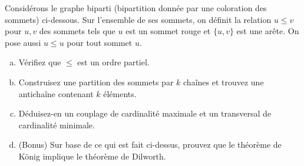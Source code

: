 \newpage


\begin{exo}
Consid\'erons le graphe biparti (bipartition donn\'ee par une coloration des sommets) ci-dessous. Sur l'ensemble de ses sommets, on d\'efinit la relation $u\leq v$ pour $u,v$ des sommets tels que $u$ est un sommet rouge et $\{u,v\}$ est une ar\^ete. On pose aussi $u\leq u$ pour tout sommet $u$. \\
\begin{enumerate}[(a)]
\item V\'erifiez que $\leq$ est un ordre partiel.
\item Construisez une partition des sommets par $k$ cha\^ines et trouvez une anticha\^ine contenant $k$ \'el\'ements.
\item D\'eduisez-en un couplage de cardinalit\'e maximale et un transversal de cardinalit\'e minimale. 
\item (Bonus) Sur base de ce qui est fait ci-dessus, prouvez que le th\'eor\`eme de K\"onig implique le th\'eor\`eme de Dilworth.
\end{enumerate}
\end{exo}

\begin{figure}[!h,scale=0.80]
\begin{center}

\end{center}
\caption{}
\end{figure}

